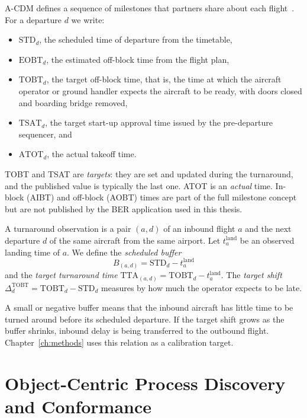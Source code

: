 A-CDM defines a sequence of milestones that partners share about each flight~\cite{eurocontrol_acdm}. For a departure $d$ we write:
\begin{itemize}
\item $\mathrm{STD}_d$, the scheduled time of departure from the timetable,
\item $\mathrm{EOBT}_d$, the estimated off-block time from the flight plan,
\item $\mathrm{TOBT}_d$, the target off-block time, that is, the time at which the aircraft operator or ground handler expects the aircraft to be ready, with doors closed and boarding bridge removed,
\item $\mathrm{TSAT}_d$, the target start-up approval time issued by the pre-departure sequencer, and
\item $\mathrm{ATOT}_d$, the actual takeoff time.
\end{itemize}
TOBT and TSAT are \emph{targets}: they are set and updated during the turnaround, and the published value is typically the last one. ATOT is an \emph{actual} time. In-block (AIBT) and off-block (AOBT) times are part of the full milestone concept but are not published by the BER application used in this thesis.

\begin{definition}
\label{def:taobs}
A turnaround observation is a pair $(a,d)$ of an inbound flight $a$ and the next departure $d$ of the same aircraft from the same airport. Let $t_a^{\mathrm{land}}$ be an observed landing time of $a$. We define the \emph{scheduled buffer}
\[
B_{(a,d)}=\mathrm{STD}_d-t_a^{\mathrm{land}}
\]
and the \emph{target turnaround time} $\mathrm{TTA}_{(a,d)}=\mathrm{TOBT}_d-t_a^{\mathrm{land}}$. The \emph{target shift} $\Delta^{\mathrm{TOBT}}_d=\mathrm{TOBT}_d-\mathrm{STD}_d$ measures by how much the operator expects to be late.
\end{definition}

A small or negative buffer means that the inbound aircraft has little time to be turned around before its scheduled departure. If the target shift grows as the buffer shrinks, inbound delay is being transferred to the outbound flight. Chapter~\ref{ch:methods} uses this relation as a calibration target.

\section{Object-Centric Process Discovery and Conformance}
\label{sec:prelim-pm}

